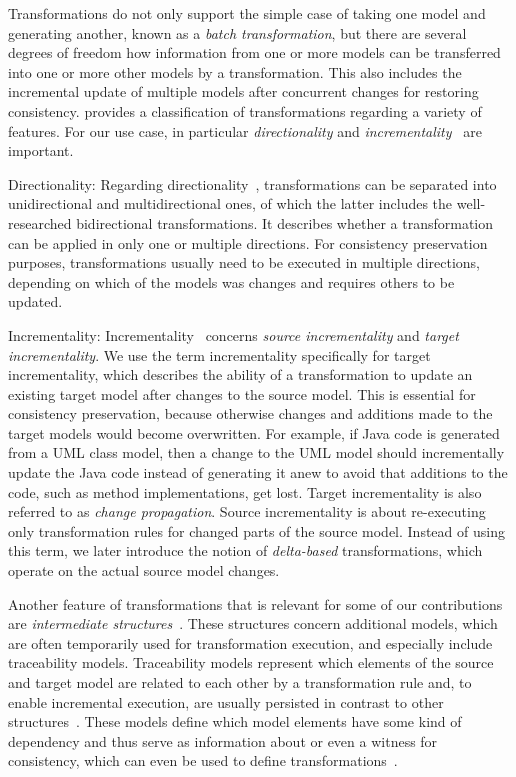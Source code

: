 Transformations do not only support the simple case of taking one model and generating another, known as a \emph{batch transformation}, but there are several degrees of freedom how information from one or more models can be transferred into one or more other models by a transformation.
This also includes the incremental update of multiple models after concurrent changes for restoring consistency.
\textcite{czarnecki2006a} provides a classification of transformations regarding a variety of features.
For our use case, in particular \emph{directionality} and \emph{incrementality}~\cite[p.~14]{czarnecki2006a} are important.
\begin{properdescription}
    \item[Directionality:] Regarding directionality~\cite[Fig.~19]{czarnecki2006a}, transformations can be separated into unidirectional and multidirectional ones, of which the latter includes the well-researched bidirectional transformations.
    It describes whether a transformation can be applied in only one or multiple directions.
    For consistency preservation purposes, transformations usually need to be executed in multiple directions, depending on which of the models was changes and requires others to be updated.
    \item[Incrementality:] Incrementality~\cite[Fig.~19]{czarnecki2006a} concerns \emph{source incrementality} and \emph{target incrementality}.
    We use the term incrementality specifically for target incrementality, which describes the ability of a transformation to update an existing target model after changes to the source model. This is essential for consistency preservation, because otherwise changes and additions made to the target models would become overwritten. For example, if Java code is generated from a \gls{UML} class model, then a change to the \gls{UML} model should incrementally update the Java code instead of generating it anew to avoid that additions to the code, such as method implementations, get lost.
    Target incrementality is also referred to as \emph{change propagation}.
    Source incrementality is about re-executing only transformation rules for changed parts of the source model.
    Instead of using this term, we later introduce the notion of \emph{delta-based} transformations, which operate on the actual source model changes.
\end{properdescription}

Another feature of transformations that is relevant for some of our contributions are \emph{intermediate structures}~\cite[p.~10]{czarnecki2006a}.
These structures concern additional models, which are often temporarily used for transformation execution, and especially include traceability models.
Traceability models represent which elements of the source and target model are related to each other by a transformation rule and, to enable incremental execution, are usually persisted in contrast to other structures~\cite[p.~10]{czarnecki2006a}.
These models define which model elements have some kind of dependency and thus serve as information about or even a witness for consistency, which can even be used to define transformations~\cite{diskin2017traceabilityMappings-fse}.

